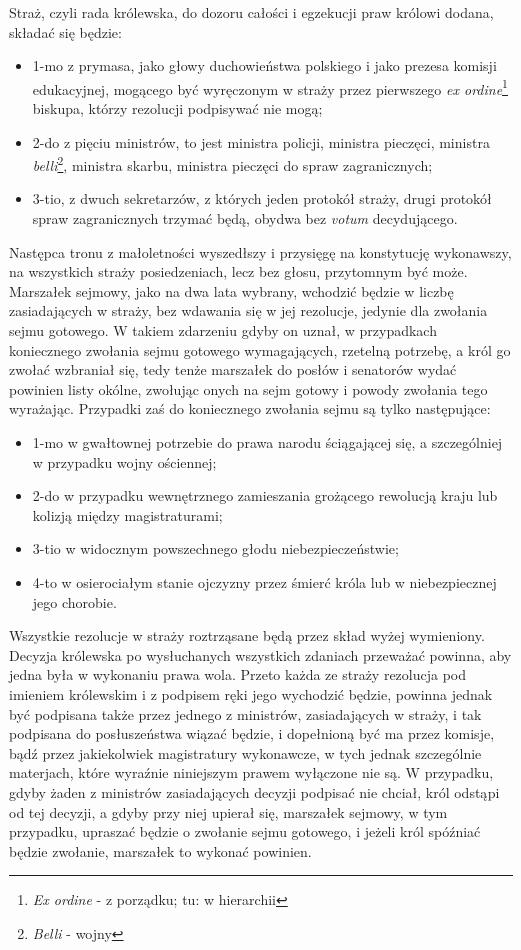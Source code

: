 \documentclass{book}
\begin{document}
 Straż, czyli rada królewska, do dozoru całości i egzekucji praw królowi dodana, składać się będzie: 
\begin{itemize}
\item 1-mo z prymasa, jako głowy duchowieństwa polskiego  i jako prezesa komisji edukacyjnej, mogącego być wyręczonym w straży przez pierwszego \textit{ex ordine}\footnote{\textit{Ex ordine} - z porządku; tu: w hierarchii}  biskupa, którzy rezolucji podpisywać nie mogą;  
\item 2-do z pięciu ministrów, to jest ministra policji, ministra pieczęci, ministra \textit{belli}\footnote{\textit{Belli} - wojny}, ministra skarbu, ministra pieczęci do spraw zagranicznych; 
\item 3-tio, z dwuch sekretarzów, z których jeden protokół straży, drugi protokół spraw zagranicznych trzymać będą, obydwa bez \textit{votum} decydującego.  
\end{itemize}
Następca tronu z małoletności wyszedłszy i przysięgę na konstytucję wykonawszy, na wszystkich straży posiedzeniach, lecz bez głosu, przytomnym być może.  Marszałek sejmowy, jako na dwa lata wybrany, wchodzić będzie w liczbę zasiadających w straży, bez wdawania się w jej rezolucje, jedynie dla zwołania sejmu gotowego. W takiem zdarzeniu gdyby on uznał, w przypadkach koniecznego zwołania sejmu gotowego wymagających, rzetelną potrzebę, a król go zwołać wzbraniał się,  tedy tenże marszałek do posłów i senatorów wydać powinien listy okólne, zwołując onych na sejm gotowy i powody zwołania tego wyrażając. Przypadki zaś do koniecznego zwołania sejmu są tylko następujące:  
\begin{itemize}
\item 1-mo w gwałtownej potrzebie do prawa narodu ściągającej się, a szczególniej w przypadku wojny ościennej; 
\item 2-do w przypadku wewnętrznego zamieszania grożącego rewolucją kraju lub kolizją między magistraturami;  
\item 3-tio w widocznym powszechnego głodu niebezpieczeństwie; 
\item 4-to w osierociałym stanie ojczyzny przez śmierć króla lub w niebezpiecznej jego chorobie. 
\end{itemize}
Wszystkie rezolucje w straży roztrząsane będą przez skład wyżej wymieniony.  Decyzja królewska po wysłuchanych wszystkich zdaniach przeważać powinna, aby jedna była w wykonaniu prawa wola.  Przeto każda ze straży rezolucja pod imieniem królewskim i z podpisem ręki jego wychodzić będzie, powinna jednak być podpisana także przez jednego z ministrów, zasiadających w straży, i tak podpisana do posłuszeństwa wiązać będzie,  i dopełnioną być ma przez komisje, bądź przez jakiekolwiek magistratury wykonawcze, w tych jednak szczególnie materjach, które wyraźnie niniejszym prawem wyłączone nie są.  W przypadku, gdyby żaden z ministrów zasiadających decyzji podpisać nie chciał, król odstąpi od tej decyzji, a gdyby przy niej upierał się, marszałek sejmowy,  w tym przypadku, upraszać będzie o zwołanie sejmu gotowego, i jeżeli król spóźniać będzie zwołanie, marszałek to wykonać powinien. 
\end{document}
